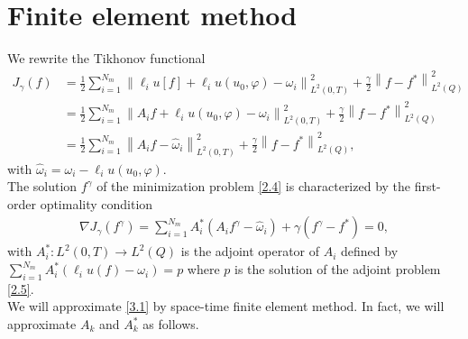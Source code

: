 \documentclass[]{article}
\begin{document}
\section{Finite element method}\label{section4}
We rewrite the Tikhonov functional
\begin{align*}
	J_\gamma(f)&=\frac{1}{2}\sum_{i=1}^{N_m}\left\|\ell_i u[f]+\ell_i u(u_0, \varphi)-\omega_i\right\|^2_{L^2(0, T)}+\frac{\gamma}{2}\left\|f-f^*\right\|^2_{L^2(Q)}\\
	&=\frac{1}{2}\sum_{i=1}^{N_m}\left\|A_if+\ell_i u(u_0, \varphi)-\omega_i\right\|^2_{L^2(0, T)}+\frac{\gamma}{2}\left\|f-f^*\right\|^2_{L^2(Q)}\\
	&=\frac{1}{2}\sum_{i=1}^{N_m}\left\|A_if-\hat{\omega}_i\right\|^2_{L^2(0, T)}+\frac{\gamma}{2}\left\|f-f^*\right\|^2_{L^2(Q)},
\end{align*}
with $\hat{\omega}_i=\omega_i-\ell_i u(u_0, \varphi)$.
\\
The solution $f^\gamma$ of the minimization problem \eqref{2.4} is characterized by the first-order optimality condition
\begin{align}\label{3.1}
	\nabla J_\gamma(f^\gamma)= \sum_{i=1}^{N_m}A^*_i(A_if^\gamma-\hat{\omega}_i)+\gamma(f^\gamma-f^*)=0,
\end{align}
with $A_i^*: L^2(0, T)\to L^2(Q)$ is the adjoint operator of $A_i$ defined by $\sum_{i=1}^{N_m}A_i^*\left(\ell_i u(f) - \omega_i\right) = p$ where $p$ is the solution of the adjoint problem \eqref{2.5}. 
\\
We will approximate \eqref{3.1} by space-time finite element method. In fact, we will approximate $A_k$ and $A^*_k$ as follows.
\end{document}
